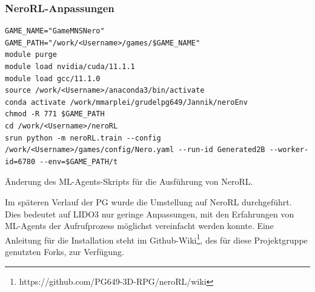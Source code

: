 \subsubsection{NeroRL-Anpassungen}
\begin{listing}
	\begin{verbatim}
GAME_NAME="GameMNSNero"
GAME_PATH="/work/<Username>/games/$GAME_NAME"
module purge
module load nvidia/cuda/11.1.1
module load gcc/11.1.0
source /work/<Username>/anaconda3/bin/activate
conda activate /work/mmarplei/grudelpg649/Jannik/neroEnv
chmod -R 771 $GAME_PATH
cd /work/<Username>/neroRL  
srun python -m neroRL.train --config /work/<Username>/games/config/Nero.yaml --run-id Generated2B --worker-id=6780 --env=$GAME_PATH/t
	\end{verbatim}
	\caption{Änderung des ML-Agents-Skripts für die Ausführung von NeroRL.}
	\label{prog:neroRlChanges}
\end{listing}
Im späteren Verlauf der PG wurde die Umstellung auf NeroRL durchgeführt. Dies bedeutet auf LIDO3 nur geringe Anpassungen, mit den Erfahrungen von ML-Agents der Aufrufprozess möglichst vereinfacht werden konnte. Eine Anleitung für die Installation steht im Github-Wiki\footnote{https://github.com/PG649-3D-RPG/neroRL/wiki}, des für diese Projektgruppe genutzten Forks, zur Verfügung.



